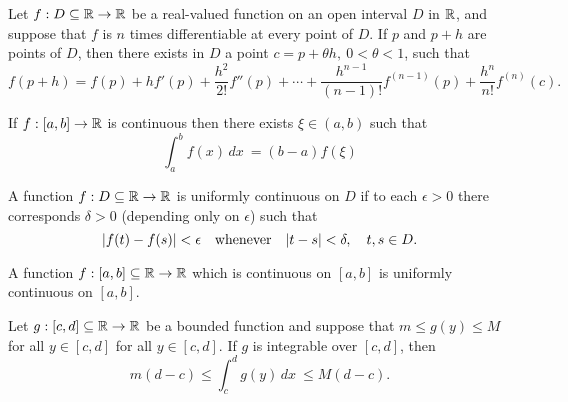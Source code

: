 \documentclass{article}
\begin{document}
\begin{theorem}
    Let $f: D \subseteq \mathbb{R} \rightarrow \mathbb{R}$ be a real-valued function on an open interval $D$
    in $\mathbb{R}$, and suppose that $f$ is $n$ times differentiable at every point of $D$. If $p$ and $p + h$ are
    points of $D$, then there exists in $D$ a point $c = p + \theta h,\ 0 < \theta < 1$, such that
    \begin{equation*}
        f(p + h) = f(p) + hf'(p) + \frac{h^2}{2!}f''(p) + \cdots + \frac{h^{n-1}}{(n-1)!}f^{(n-1)}(p) + \frac{h^n}{n!}f^{(n)}(c).
    \end{equation*}
\end{theorem}
\begin{theorem}
    If $f: [a, b] \rightarrow \mathbb{R}$ is continuous then there exists $\xi \in (a, b)$ such that
    \begin{equation*}
        \int_{a}^{b} f(x) \, dx\ = (b-a)f(\xi)
    \end{equation*}
\end{theorem}
\begin{definition}
    A function $f: D \subseteq \mathbb{R} \rightarrow \mathbb{R}$ is uniformly continuous on $D$ if to each $\epsilon > 0$
    there corresponds $\delta > 0$ (depending only on $\epsilon$) such that
    \begin{equation*}
        \lvert f(t) - f(s)\rvert < \epsilon \quad \textnormal{whenever} \quad \lvert t - s\rvert < \delta, \quad t,s \in D.
    \end{equation*}
\end{definition}

\begin{theorem}
    A function $f: [a, b] \subseteq \mathbb{R} \rightarrow \mathbb{R}$ which is continuous on
    $[a, b]$ is uniformly continuous on $[a, b]$.
\end{theorem}

\begin{theorem}
    Let $g: [c, d] \subseteq \mathbb{R} \rightarrow \mathbb{R}$ be a bounded function and suppose that
    $m \leq g(y) \leq M$ for all $y \in [c, d]$ for all $y \in [c, d]$. If $g$ is integrable over
    $[c, d]$, then
    \begin{equation*}
        m(d - c) \leq \int_{c}^{d} g(y) \, dx\ \leq M(d - c).
    \end{equation*}
\end{theorem}
\end{document}
